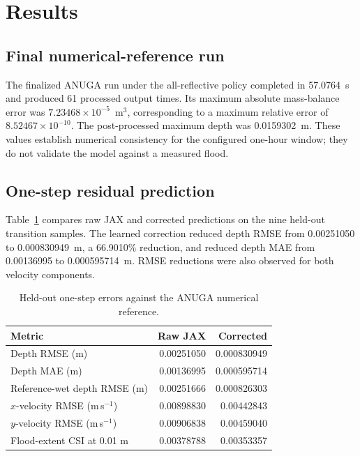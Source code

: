 \section{Results}
\label{sec:results}

\subsection{Final numerical-reference run}

The finalized ANUGA run under the all-reflective policy completed in
57.0764~s and produced 61 processed output times.  Its maximum absolute
mass-balance error was \(7.23468\times10^{-5}\)~m\(^3\), corresponding to a
maximum relative error of \(8.52467\times10^{-10}\).  The post-processed
maximum depth was 0.0159302~m.  These values establish numerical consistency
for the configured one-hour window; they do not validate the model against a
measured flood.

\subsection{One-step residual prediction}

Table~\ref{tab:one-step-results} compares raw JAX and corrected predictions
on the nine held-out transition samples.  The learned correction reduced depth
RMSE from 0.00251050 to 0.000830949~m, a 66.9010\% reduction, and reduced
depth MAE from 0.00136995 to 0.000595714~m.  RMSE reductions were also
observed for both velocity components.

\begin{table}[htbp]
    \centering
    \caption{Held-out one-step errors against the ANUGA numerical reference.}
    \label{tab:one-step-results}
    \begin{tabular}{lrr}
        \hline
        Metric & Raw JAX & Corrected \\
        \hline
        Depth RMSE (m) & 0.00251050 & 0.000830949 \\
        Depth MAE (m) & 0.00136995 & 0.000595714 \\
        Reference-wet depth RMSE (m) & 0.00251666 & 0.000826303 \\
        \(x\)-velocity RMSE (m\,s\(^{-1}\)) & 0.00898830 & 0.00442843 \\
        \(y\)-velocity RMSE (m\,s\(^{-1}\)) & 0.00906838 & 0.00459040 \\
        Flood-extent CSI at 0.01 m & 0.00378788 & 0.00353357 \\
        \hline
    \end{tabular}
\end{table}


